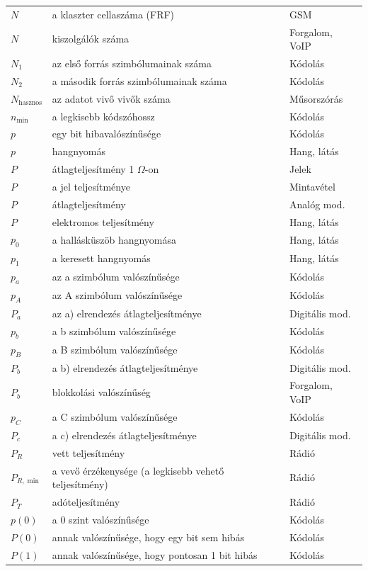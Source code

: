 {\begin{longtable}{@{}>{\raggedright\arraybackslash}p{2.4cm}>{\raggedright\arraybackslash}p{8.2cm}>{\raggedright\arraybackslash}p{3.8cm}@{}}
$N$ & a klaszter cellaszáma (FRF) & GSM\\
$N$ & kiszolgálók száma & Forgalom, VoIP\\
$N_1$ & az első forrás szimbólumainak száma & Kódolás\\
$N_2$ & a második forrás szimbólumainak száma & Kódolás\\
$N_\text{hasznos}$ & az adatot vivő vivők száma & Műsorszórás\\
$n_{\min}$ & a legkisebb kódszóhossz & Kódolás\\
$p$ & egy bit hibavalószínűsége & Kódolás\\
$p$ & hangnyomás & Hang, látás\\
$P$ & átlagteljesítmény 1 $\Omega$-on & Jelek\\
$P$ & a jel teljesítménye & Mintavétel\\
$P$ & átlagteljesítmény & Analóg mod.\\
$P$ & elektromos teljesítmény & Hang, látás\\
$p_0$ & a hallásküszöb hangnyomása & Hang, látás\\
$p_1$ & a keresett hangnyomás & Hang, látás\\
$p_a$ & az a szimbólum valószínűsége & Kódolás\\
$p_A$ & az A szimbólum valószínűsége & Kódolás\\
$P_a$ & az a) elrendezés átlagteljesítménye & Digitális mod.\\
$p_b$ & a b szimbólum valószínűsége & Kódolás\\
$p_B$ & a B szimbólum valószínűsége & Kódolás\\
$P_b$ & a b) elrendezés átlagteljesítménye & Digitális mod.\\
$P_b$ & blokkolási valószínűség & Forgalom, VoIP\\
$p_C$ & a C szimbólum valószínűsége & Kódolás\\
$P_c$ & a c) elrendezés átlagteljesítménye & Digitális mod.\\
$P_R$ & vett teljesítmény & Rádió\\
$P_{R,\min}$ & a vevő érzékenysége (a legkisebb vehető teljesítmény) & Rádió\\
$P_T$ & adóteljesítmény & Rádió\\
$p(0)$ & a 0 szint valószínűsége & Kódolás\\
$P(0)$ & annak valószínűsége, hogy egy bit sem hibás & Kódolás\\
$P(1)$ & annak valószínűsége, hogy pontosan 1 bit hibás & Kódolás\\

\end{longtable}}
